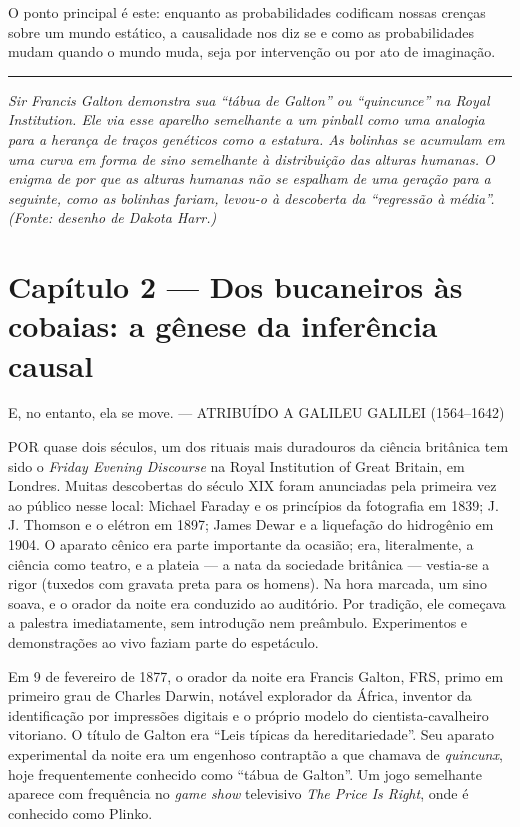 \documentclass[11pt,a5paper,twoside]{book}
\begin{document}
O ponto principal é este: enquanto as probabilidades codificam nossas crenças sobre um mundo estático, a causalidade nos diz se e como as probabilidades mudam quando o mundo muda, seja por intervenção ou por ato de imaginação.

\vspace{1em}\hrule\vspace{1em}
\textit{Sir Francis Galton demonstra sua “tábua de Galton” ou “quincunce” na Royal Institution. Ele via esse aparelho semelhante a um pinball como uma analogia para a herança de traços genéticos como a estatura. As bolinhas se acumulam em uma curva em forma de sino semelhante à distribuição das alturas humanas. O enigma de por que as alturas humanas não se espalham de uma geração para a seguinte, como as bolinhas fariam, levou-o à descoberta da “regressão à média”. (Fonte: desenho de Dakota Harr.)}

\chapter{Capítulo 2 — Dos bucaneiros às cobaias: a gênese da inferência causal}
E, no entanto, ela se move. — ATRIBUÍDO A GALILEU GALILEI (1564–1642)

POR quase dois séculos, um dos rituais mais duradouros da ciência britânica tem sido o \textit{Friday Evening Discourse} na Royal Institution of Great Britain, em Londres. Muitas descobertas do século XIX foram anunciadas pela primeira vez ao público nesse local: Michael Faraday e os princípios da fotografia em 1839; J. J. Thomson e o elétron em 1897; James Dewar e a liquefação do hidrogênio em 1904. O aparato cênico era parte importante da ocasião; era, literalmente, a ciência como teatro, e a plateia — a nata da sociedade britânica — vestia-se a rigor (tuxedos com gravata preta para os homens). Na hora marcada, um sino soava, e o orador da noite era conduzido ao auditório. Por tradição, ele começava a palestra imediatamente, sem introdução nem preâmbulo. Experimentos e demonstrações ao vivo faziam parte do espetáculo.

Em 9 de fevereiro de 1877, o orador da noite era Francis Galton, FRS, primo em primeiro grau de Charles Darwin, notável explorador da África, inventor da identificação por impressões digitais e o próprio modelo do cientista-cavalheiro vitoriano. O título de Galton era “Leis típicas da hereditariedade”. Seu aparato experimental da noite era um engenhoso contraptão a que chamava de \textit{quincunx}, hoje frequentemente conhecido como “tábua de Galton”. Um jogo semelhante aparece com frequência no \textit{game show} televisivo \textit{The Price Is Right}, onde é conhecido como Plinko.
\end{document}
